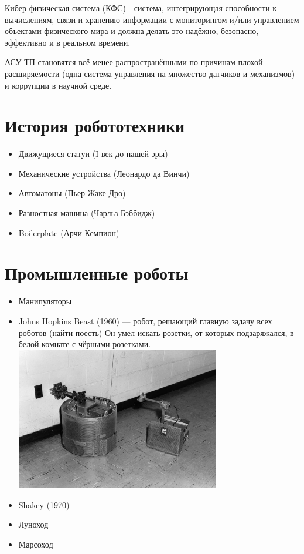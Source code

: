 \documentclass[12pt]{article}
\begin{document}
\begin{sloppypar}
    Кибер-физическая система (КФС) - система, интегрирующая способности к вычислениям,
    связи и хранению информации с мониторингом и/или управлением объектами
    физического мира и должна делать это надёжно, безопасно, эффективно и в
    реальном времени.

    АСУ ТП становятся всё менее распространёнными по причинам плохой
    расширяемости (одна система управления на множество датчиков и механизмов) и
    коррупции в научной среде.

    \section{История робототехники}
    \begin{itemize}
        \item Движущиеся статуи (I век до нашей эры)
        \item Механические устройства (Леонардо да Винчи)
        \item Автоматоны (Пьер Жаке-Дро)
        \item Разностная машина (Чарльз Бэббидж)
        \item Boilerplate (Арчи Кемпион)
    \end{itemize}

    \section{Промышленные роботы}
    \begin{itemize}
        \item Манипуляторы
        \item Johns Hopkins Beast (1960) — робот, решающий главную задачу всех
              роботов (найти поесть) Он умел искать розетки, от которых
              подзаряжался, в белой комнате с чёрными розетками.
              \includegraphics[width=0.7\textwidth]{graphics/johns_beast.jpg}
        \item Shakey (1970)
        \item Луноход
        \item Марсоход
    \end{itemize}


\end{sloppypar}
\end{document}
